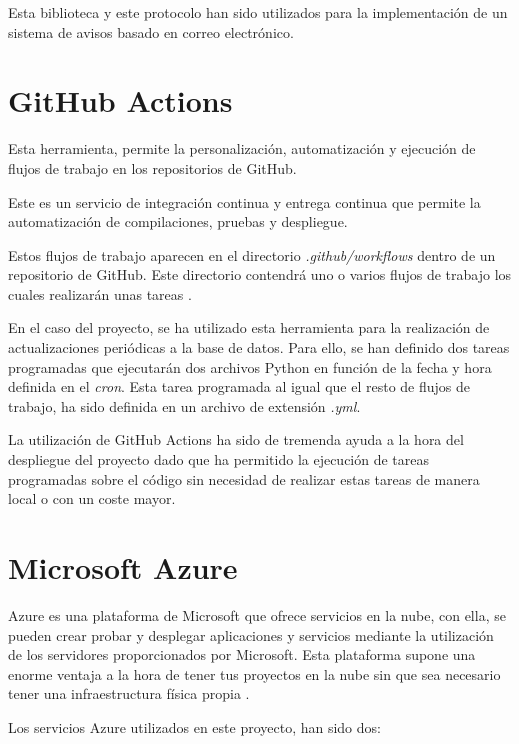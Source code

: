 Esta biblioteca y este protocolo han sido utilizados para la implementación de un sistema de avisos basado en correo electrónico.

\section{GitHub Actions}
Esta herramienta, permite la personalización, automatización y ejecución de flujos de trabajo en los repositorios de GitHub.

Este es un servicio de integración continua y entrega continua que permite la automatización de compilaciones, pruebas y despliegue.

Estos flujos de trabajo aparecen en el directorio \textit{.github/workflows} dentro de un repositorio de GitHub. Este directorio contendrá uno o varios flujos de trabajo los cuales realizarán unas tareas \cite{githubactions:latex}.

En el caso del proyecto, se ha utilizado esta herramienta para la realización de actualizaciones periódicas a la base de datos. Para ello, se han definido dos tareas programadas que ejecutarán dos archivos Python en función de la fecha y hora definida en el \textit{cron}. Esta tarea programada al igual que el resto de flujos de trabajo, ha sido definida en un archivo de extensión \textit{.yml}.

La utilización de GitHub Actions ha sido de tremenda ayuda a la hora del despliegue del proyecto dado que ha permitido la ejecución de tareas programadas sobre el código sin necesidad de realizar estas tareas de manera local o con un coste mayor.

\section{Microsoft Azure}

Azure es una plataforma de Microsoft que ofrece servicios en la nube, con ella, se pueden crear probar y desplegar aplicaciones y servicios mediante la utilización de los servidores proporcionados por Microsoft. Esta plataforma supone una enorme ventaja a la hora de tener tus proyectos en la nube sin que sea necesario tener una infraestructura física propia \cite{azure:latex}.

Los servicios Azure utilizados en este proyecto, han sido dos:

